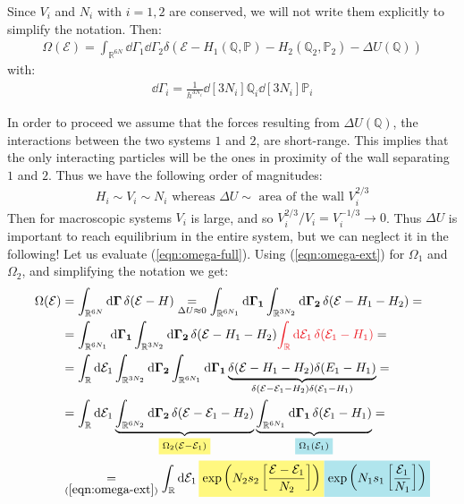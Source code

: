 \documentclass[../../main.tex]{subfiles}
\begin{document}

Since $V_i$ and $N_i$ with $i=1,2$ are conserved, we will not write them explicitly to simplify the notation. Then:
\begin{align} \label{eqn:omega-full}
    \Omega(\mathcal{E}) = \int_{\mathbb{R}^{6N}} \dd{\Gamma_1} \dd{\Gamma_2} \delta(\mathcal{E}-H_1(\mathbb{Q},\mathbb{P}) - H_2(\mathbb{Q}_2, \mathbb{P}_2) - \Delta U(\mathbb{Q}))
\end{align}
with:
\begin{align*}
    \dd{\Gamma_i} = \frac{1}{h^{3N_i}} \dd[3N_i] \mathbb{Q}_i \dd[3N_i] \mathbb{P}_i
\end{align*}

In order to proceed we assume that the forces resulting from $\Delta U(\mathbb{Q})$, the interactions between the two systems $1$ and $2$, are short-range. This implies that the only interacting particles will be the ones in proximity of the wall separating $1$ and $2$. Thus we have the following order of magnitudes:
\begin{align*}
    H_i \sim V_i \sim N_i \text{ whereas } \Delta U \sim \text{ area of the wall } V_i^{2/3}
\end{align*}
Then for macroscopic systems $V_i$ is large, and so $V_i^{2/3}/V_i = V_i^{-1/3} \to 0$. Thus $\Delta U$ is important to reach equilibrium in the entire system, but we can neglect it in the following! Let us evaluate (\ref{eqn:omega-full}). Using (\ref{eqn:omega-ext}) for $\Omega_1$ and $\Omega_2$, and simplifying the notation we get:
\begin{align}\label{eqn:52}
    \Omega(\mathcal{E}) &= \int_{\mathbb{R}^{6N}} \dd{\bm{\Gamma}} \delta(\mathcal{E}-H) \underset{\Delta U \approx 0}{=} \int_{\mathbb{R}^{6N_1}} \dd{\bm{\Gamma_1}} \int_{\mathbb{R}^{3N_2}} \dd{\bm{\Gamma_2}} \delta(\mathcal{E}-H_1 - H_2) =\\ \nonumber
    &= \int_{\mathbb{R}^{6N_1}} \dd{\bm{\Gamma_1}} \int_{\mathbb{R}^{3N_2}} \dd{\bm{\Gamma_2}} \delta(\mathcal{E}-H_1 -H_2) \textcolor{Red}{\int_{\mathbb{R}} \dd{\mathcal{E}_1} \delta(\mathcal{E}_1 - H_1)} =\\ \nonumber
    &= \int_{\mathbb{R}} \dd{\mathcal{E}_1} \int_{\mathbb{R}^{3N_2}} \dd{\bm{\Gamma_2}}  \int_{\mathbb{R}^{6N_1}} \dd{\bm{\Gamma_1}} \underbrace{\delta(\mathcal{E}-H_1-H_2) \delta(E_1-H_1)}_{\delta(\mathcal{E}-\mathcal{E}_1-H_2) \delta(\mathcal{E}_1-H_1)}  =\\ \nonumber
    &= \int_{\mathbb{R}}\dd{\mathcal{E}_1} \underbrace{\int_{\mathbb{R}^{6N_2}} \dd{\bm{\Gamma_2}} \delta(\mathcal{E}-\mathcal{E}_1-H_2)}_{\hlc{Yellow}{\scriptstyle \Omega_2(\mathcal{E}-\mathcal{E}_1)}}  \underbrace{\int_{\mathbb{R}^{6N_1}} \dd{\bm{\Gamma_1}} \delta(\mathcal{E}_1 - H_1)}_{\hlc{SkyBlue}{\scriptstyle \Omega_1(\mathcal{E}_1)}} =\\ \nonumber
    &\underset{(\ref{eqn:omega-ext})}{=}  \int_{\mathbb{R}} \dd{\mathcal{E}_1} \hlc{Yellow}{\exp\left(N_2 s_2 \left[\frac{\mathcal{E}-\mathcal{E}_1}{N_2}\right] \right) }\hlc{SkyBlue}{\exp\left( N_1 s_1 \left[\frac{\mathcal{E}_1}{N_1}  \right]\right)}
\end{align}
\end{document}
